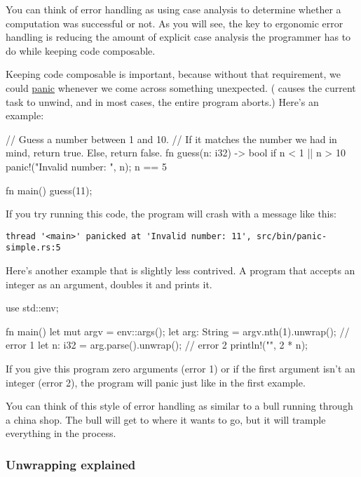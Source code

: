You can think of error handling as using case analysis to determine whether a computation was successful or not. As 
you will see, the key to ergonomic error handling is reducing the amount of explicit case analysis the programmer has 
to do while keeping code composable.

\blank

Keeping code composable is important, because without that requirement, we could 
\href{https://doc.rust-lang.org/std/macro.panic!.html}{panic} whenever we come across something unexpected. ( 
causes the current task to unwind, and in most cases, the entire program aborts.) Here's an example:

\begin{rustc}
// Guess a number between 1 and 10.
// If it matches the number we had in mind, return true. Else, return false.
fn guess(n: i32) -> bool {
    if n < 1 || n > 10 {
        panic!("Invalid number: {}", n);
    }
    n == 5
}

fn main() {
    guess(11);
}
\end{rustc}

If you try running this code, the program will crash with a message like this:

\begin{verbatim}
thread '<main>' panicked at 'Invalid number: 11', src/bin/panic-simple.rs:5
\end{verbatim}

Here's another example that is slightly less contrived. A program that accepts an integer as an argument, doubles 
it and prints it.

\begin{rustc}
use std::env;

fn main() {
    let mut argv = env::args();
    let arg: String = argv.nth(1).unwrap(); // error 1
    let n: i32 = arg.parse().unwrap(); // error 2
    println!("{}", 2 * n);
}
\end{rustc}

If you give this program zero arguments (error 1) or if the first argument isn't an integer (error 2), the program will 
panic just like in the first example.

\blank

You can think of this style of error handling as similar to a bull running through a china shop. The bull will get to where 
it wants to go, but it will trample everything in the process.

\subsubsection*{Unwrapping explained}

